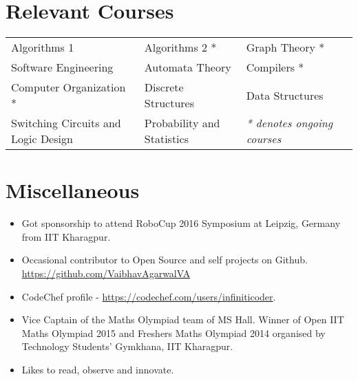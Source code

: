 \documentclass[11pt,a4paper]{moderncv}
\begin{document}
\section*{Relevant Courses}
\begin{tabular}{L{7.2cm} L{6.0cm} L{5.6cm}l}
  Algorithms 1 & Algorithms 2 * &
  Graph Theory * \\  Software Engineering & Automata Theory &  Compilers * \\
  Computer Organization *  & Discrete Structures & Data Structures\\
  Switching Circuits and Logic Design &
  Probability and Statistics & \textit{* denotes ongoing courses} \\
\end{tabular}

\section*{Miscellaneous}
\begin{itemize}
  \item Got sponsorship to attend RoboCup 2016 Symposium at Leipzig, Germany from IIT Kharagpur.
  \item Occasional contributor to Open Source and self projects on Github.
    \url{https://github.com/VaibhavAgarwalVA}
  \item CodeChef profile - \url{https://codechef.com/users/infiniticoder}.
  \item Vice Captain of the Maths Olympiad team of MS Hall. Winner of Open IIT Maths Olympiad 2015 and Freshers Maths Olympiad 2014 organised by Technology Students' Gymkhana, IIT Kharagpur.
  \item Likes to read, observe and innovate.
\end{itemize}
\end{document}
